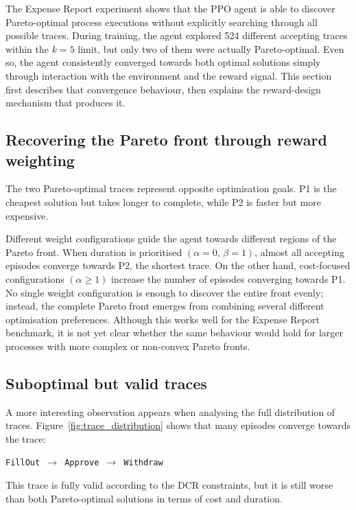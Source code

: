 The Expense Report experiment shows that the \ac{PPO} agent is able to discover Pareto-optimal process executions without explicitly searching through all possible traces. During training, the agent explored 524 different accepting traces within the $k{=}5$ limit, but only two of them were actually Pareto-optimal. Even so, the agent consistently converged towards both optimal solutions simply through interaction with the environment and the reward signal. This section first describes that convergence behaviour, then explains the reward-design mechanism that produces it.

\subsection{Recovering the Pareto front through reward weighting}

The two Pareto-optimal traces represent opposite optimisation goals. P1 is the cheapest solution but takes longer to complete, while P2 is faster but more expensive.

Different weight configurations guide the agent towards different regions of the Pareto front. When duration is prioritised $(\alpha{=}0,\,\beta{=}1)$, almost all accepting episodes converge towards P2, the shortest trace. On the other hand, cost-focused configurations $(\alpha{\geq}1)$ increase the number of episodes converging towards P1. No single weight configuration is enough to discover the entire front evenly; instead, the complete Pareto front emerges from combining several different optimisation preferences. Although this works well for the Expense Report benchmark, it is not yet clear whether the same behaviour would hold for larger processes with more complex or non-convex Pareto fronts.

\subsection{Suboptimal but valid traces}

A more interesting observation appears when analysing the full distribution of traces. Figure~\ref{fig:trace_distribution} shows that many episodes converge towards the trace:

\begin{center}
\texttt{FillOut $\to$ Approve $\to$ Withdraw}
\end{center}

This trace is fully valid according to the \ac{DCR} constraints, but it is still worse than both Pareto-optimal solutions in terms of cost and duration.

